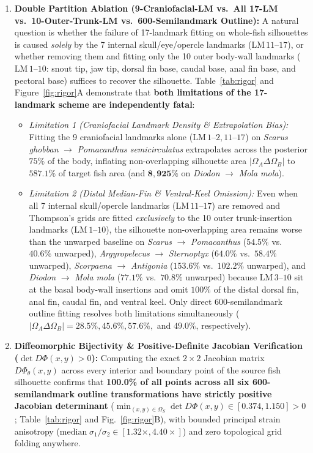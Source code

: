 \documentclass[11pt,a4paper]{article}
\theoremstyle{definition}
\theoremstyle{remark}
\begin{document}
\begin{enumerate}
  \item \textbf{Double Partition Ablation (9-Craniofacial-LM vs.\ All 17-LM vs.\ 10-Outer-Trunk-LM vs.\ 600-Semilandmark Outline):}
  A natural question is whether the failure of 17-landmark fitting on whole-fish silhouettes is caused \emph{solely} by the 7 internal skull/eye/opercle landmarks ($\mathrm{LM}\,11\text{--}17$), or whether removing them and fitting only the 10 outer body-wall landmarks ($\mathrm{LM}\,1\text{--}10$: snout tip, jaw tip, dorsal fin base, caudal base, anal fin base, and pectoral base) suffices to recover the silhouette. Table~\ref{tab:rigor} and Figure~\ref{fig:rigor}A demonstrate that \textbf{both limitations of the 17-landmark scheme are independently fatal}:
  \begin{itemize}
    \item \emph{Limitation 1 (Craniofacial Landmark Density \& Extrapolation Bias):} Fitting the 9 craniofacial landmarks alone ($\mathrm{LM}\,1\text{--}2, 11\text{--}17$) on \emph{Scarus ghobban} $\to$ \emph{Pomacanthus semicirculatus} extrapolates across the posterior $75\%$ of the body, inflating non-overlapping silhouette area $|\Omega_A \Delta \Omega_B|$ to $\mathbf{587.1\%}$ of target fish area (and $\mathbf{8{,}925\%}$ on \emph{Diodon} $\to$ \emph{Mola mola}).
    \item \emph{Limitation 2 (Distal Median-Fin \& Ventral-Keel Omission):} Even when all 7 internal skull/opercle landmarks ($\mathrm{LM}\,11\text{--}17$) are removed and Thompson's grids are fitted \emph{exclusively} to the 10 outer trunk-insertion landmarks ($\mathrm{LM}\,1\text{--}10$), the silhouette non-overlapping area remains worse than the unwarped baseline on \emph{Scarus} $\to$ \emph{Pomacanthus} ($\mathbf{54.5\%}$ vs.\ $40.6\%$ unwarped), \emph{Argyropelecus} $\to$ \emph{Sternoptyx} ($\mathbf{64.0\%}$ vs.\ $58.4\%$ unwarped), \emph{Scorpaena} $\to$ \emph{Antigonia} ($\mathbf{153.6\%}$ vs.\ $102.2\%$ unwarped), and \emph{Diodon} $\to$ \emph{Mola mola} ($\mathbf{77.1\%}$ vs.\ $70.8\%$ unwarped) because $\mathrm{LM}\,3\text{--}10$ sit at the basal body-wall insertions and omit $100\%$ of the distal dorsal fin, anal fin, caudal fin, and ventral keel. Only direct 600-semilandmark outline fitting resolves both limitations simultaneously ($|\Omega_A \Delta \Omega_B| = \mathbf{28.5\%}, \mathbf{45.6\%}, \mathbf{57.6\%},$ and $\mathbf{49.0\%}$, respectively).
  \end{itemize}

  \item \textbf{Diffeomorphic Bijectivity \& Positive-Definite Jacobian Verification ($\det D\Phi(x,y) > 0$):}
  Computing the exact $2 \times 2$ Jacobian matrix $D\Phi_\theta(x,y)$ across every interior and boundary point of the source fish silhouette confirms that \textbf{100.0\% of all points across all six 600-semilandmark outline transformations have strictly positive Jacobian determinant} ($\min_{(x,y) \in \Omega_S} \det D\Phi(x,y) \in [0.374, 1.150] > 0$; Table~\ref{tab:rigor} and Fig.~\ref{fig:rigor}B), with bounded principal strain anisotropy ($\mathrm{median}\;\sigma_1/\sigma_2 \in [1.32\times, 4.40\times]$) and zero topological grid folding anywhere.


\end{enumerate}
\end{document}
